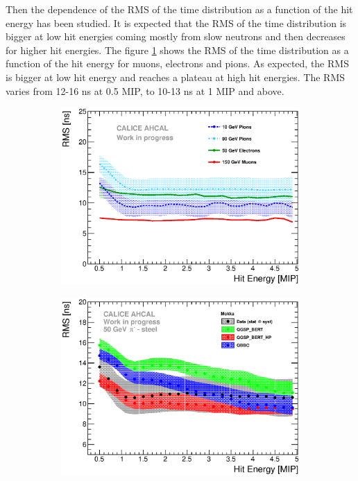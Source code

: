 Then the dependence of the RMS of the time distribution as a function of the hit energy has been studied. It is expected that the RMS of the time distribution is bigger at low hit energies coming mostly from slow neutrons and then decreases for higher hit energies. The figure \ref{fig:RMS_Energy_Comparison} shows the RMS of the time distribution as a function of the hit energy for muons, electrons and pions. As expected, the RMS is bigger at low hit energy and reaches a plateau at high hit energies. The RMS varies from 12-16 ns at 0.5 MIP, to 10-13 ns at 1 MIP and above.

\begin{figure}[htbp!]
	\begin{subfigure}[t]{0.49\textwidth}
		\centering
		\includegraphics[width=1\textwidth]{../Thesis_Plots/Timing/Pions/Plots/Timing_Energy_Comparison_ShortAsymRange_RMS.eps}
		\caption{} \label{fig:RMS_Energy_Comparison}
	\end{subfigure}
	\hfill
	\begin{subfigure}[t]{0.49\textwidth}
		\centering
		\includegraphics[width=1\textwidth]{../Thesis_Plots/Timing/Pions/Plots/ComparisonToSim/RMS_Energy_50GeV_Mokka.eps}

\end{subfigure}
\end{figure}
